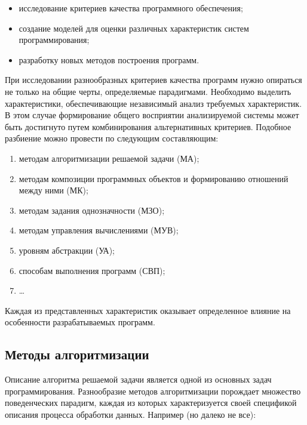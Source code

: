 \begin{itemize}
    \item исследование критериев качества программного обеспечения;
    \item создание моделей для оценки различных характеристик систем программирования;
    \item разработку новых методов построения программ.
\end{itemize}

При исследовании разнообразных критериев качества программ нужно опираться не только на общие черты, определяемые парадигмами. Необходимо выделить характеристики, обеспечивающие независимый анализ требуемых характеристик. В этом случае формирование общего восприятии анализируемой системы может быть достигнуто путем комбинирования альтернативных критериев. Подобное разбиение можно провести по следующим составляющим:

\begin{enumerate}
    \item методам алгоритмизации решаемой задачи (МА);
    \item методам композиции программных объектов и формированию отношений между ними (МК);
    \item методам задания однозначности (МЗО);
    \item методам управления вычислениями (МУВ);
    \item уровням абстракции (УА);
    \item способам выполнения программ (СВП);
    \item …
\end{enumerate}


Каждая из представленных характеристик оказывает определенное влияние на особенности разрабатываемых программ.


\subsection{Методы алгоритмизации}

Описание алгоритма решаемой задачи является одной из основных задач программирования. Разнообразие методов алгоритмизации порождает множество поведенческих парадигм, каждая из которых характеризуется своей спецификой описания процесса обработки данных. Например (но далеко не все):


